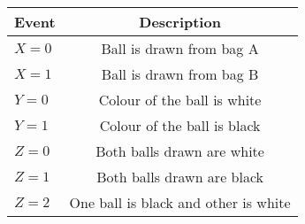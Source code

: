 \begin{tabular}{|l|c|}

\hline
\textbf{Event} & \textbf{Description} \\
\hline
$X = 0$ &  Ball is drawn from bag A \\
\hline
$X = 1$ &  Ball is drawn from bag B  \\
\hline
$Y = 0$ &  Colour of the ball is white \\
\hline
$Y = 1$ &  Colour of the ball is black\\
\hline
$Z= 0$ &  Both balls drawn are white \\
\hline
$Z= 1$ &  Both balls drawn are black \\
\hline
$Z = 2$ &  One ball is black and other is white \\
\hline
\end{tabular}